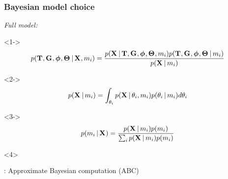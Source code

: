 \begin{frame}[t]
    \frametitle{Bayesian model choice}
    \begin{block}{\it Full model:}
        \begin{minipage}[c][3.8cm][c]{\linewidth}
            \begin{uncoverenv}<1->
            \[
                p(
                  \divTimeMapVector,
                  \geneTreeVector,
                  \hkyModelVector,
                  \demographicParamVector
                  \given \alignmentVector, \divModel{i})
                  =
                \frac{
                    p(\alignmentVector \given
                      \divTimeMapVector,
                      \geneTreeVector,
                      \hkyModelVector,
                      \demographicParamVector,
                      \divModel{i}
                      )
                      p(
                        \divTimeMapVector,
                        \geneTreeVector,
                        \hkyModelVector,
                        \demographicParamVector
                        \given \divModel{i}
                        )
                    }{p(\alignmentVector \given \divModel{i})}
            \]\vspace{-1mm}
            \end{uncoverenv}
            \begin{uncoverenv}<2->
            \[
                p(\alignmentVector \given \divModel{i}) =
                \int_{\allParameters{i}}
                p(\alignmentVector \given \allParameters{i}, \divModel{i})
                p(\allParameters{i} \given \divModel{i})
                d\allParameters{i}
            \]\vspace{-1mm}
            \end{uncoverenv}
            \begin{uncoverenv}<3->
            \[
                p(\divModel{i} \given \alignmentVector) =
                \frac{
                    p(\alignmentVector \given \divModel{i})
                    p(\divModel{i})
                }{
                    \sum_{i} p(\alignmentVector \given \divModel{i})
                    p(\divModel{i})
                }
            \]\vspace{-1mm}
            \end{uncoverenv}
        \end{minipage}
    \end{block}
    \vspace{1mm}
    \begin{uncoverenv}<4>
        \begin{center}
            \msb: Approximate Bayesian computation (ABC)

        \end{center}
    \end{uncoverenv}
\end{frame}

